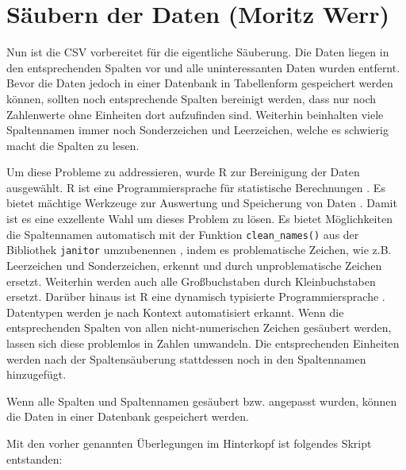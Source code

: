 \chapter{Säubern der Daten (Moritz Werr)} \label{chap:säubern}


Nun ist die CSV vorbereitet für die eigentliche Säuberung. Die Daten liegen in den entsprechenden Spalten vor und alle uninteressanten Daten wurden entfernt.
Bevor die Daten jedoch in einer Datenbank in Tabellenform gespeichert werden können, sollten noch entsprechende Spalten bereinigt werden, dass nur noch Zahlenwerte ohne Einheiten dort aufzufinden sind.
Weiterhin beinhalten viele Spaltennamen immer noch Sonderzeichen und Leerzeichen, welche es schwierig macht die Spalten zu lesen.

Um diese Probleme zu addressieren, wurde R zur Bereinigung der Daten ausgewählt.
R ist eine Programmiersprache für statistische Berechnungen \cite{noauthor_r_nodate}. Es bietet mächtige Werkzeuge zur Auswertung und Speicherung von Daten \cite{noauthor_r_nodate}. Damit ist es eine exzellente Wahl um dieses Problem zu lösen.
Es bietet Möglichkeiten die Spaltennamen automatisch mit der Funktion  \lstinline |clean_names()| aus der Bibliothek \lstinline|janitor| umzubenennen \cite{noauthor_janitor_nodate}, indem es problematische Zeichen, wie z.B. Leerzeichen und Sonderzeichen, erkennt und durch unproblematische Zeichen ersetzt.
Weiterhin werden auch alle Großbuchstaben durch Kleinbuchstaben ersetzt.
Darüber hinaus ist R eine dynamisch typisierte Programmiersprache \cite{ewendorf_algorithmic_2019}. Datentypen werden je nach Kontext automatisiert erkannt.
Wenn die entsprechenden Spalten von allen nicht-numerischen Zeichen gesäubert werden, lassen sich diese problemlos in Zahlen umwandeln.
Die entsprechenden Einheiten werden nach der Spaltensäuberung stattdessen noch in den Spaltennamen hinzugefügt.

Wenn alle Spalten und Spaltennamen gesäubert bzw. angepasst wurden, können die Daten in einer Datenbank gespeichert werden.

Mit den vorher genannten Überlegungen im Hinterkopf ist folgendes Skript entstanden: 


\lstset{
	breaklines=true,         %
	breakatwhitespace=false, %
	basicstyle=\ttfamily,    %
}


